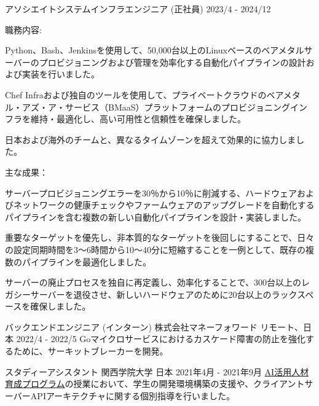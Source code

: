 \begin{cventries}
  \cventry
    {アソシエイトシステムインフラエンジニア (正社員)} %
    {} %
    {} %
    {2023/4 - 2024/12} %
    {
        職務内容:
        \begin{cvbullets}
        \item Python、Bash、Jenkinsを使用して、50,000台以上のLinuxベースのベアメタルサーバーのプロビジョニングおよび管理を効率化する自動化パイプラインの設計および実装を行いました。
        \item Chef Infraおよび独自のツールを使用して、プライベートクラウドのベアメタル・アズ・ア・サービス（BMaaS）プラットフォームのプロビジョニングインフラを維持・最適化し、高い可用性と信頼性を確保しました。
        \item 日本および海外のチームと、異なるタイムゾーンを超えて効果的に協力しました。
        \end{cvbullets}
        主な成果：
        \begin{cvbullets}
        \item サーバープロビジョニングエラーを30％から10％に削減する、ハードウェアおよびネットワークの健康チェックやファームウェアのアップグレードを自動化するパイプラインを含む複数の新しい自動化パイプラインを設計・実装しました。
        \item 重要なターゲットを優先し、非本質的なターゲットを後回しにすることで、日々の設定同期時間を3～6時間から10～40分に短縮することを一例として、既存の複数のパイプラインを最適化しました。
        \item サーバーの廃止プロセスを独自に再定義し、効率化することで、300台以上のレガシーサーバーを退役させ、新しいハードウェアのために20台以上のラックスペースを確保しました。
        \end{cvbullets}
    }

  \cventry
    {バックエンドエンジニア (インターン)} %
    {株式会社マネーフォワード} %
    {リモート、日本} %
    {2022/4 - 2022/5} %
    {
        Goマイクロサービスにおけるカスケード障害の防止を強化するために、サーキットブレーカーを開発。
    }

  \cventry
    {スタディーアシスタント} %
    {関西学院大学} %
    {日本} %
    {2021年4月 - 2021年9月} %
    {
      \href{https://www.kwansei.ac.jp/education/ai}{AI活用人材育成プログラム}の授業において、学生の開発環境構築の支援や、クライアントサーバーAPIアーキテクチャに関する個別指導を行いました。
    }


\end{cventries}
